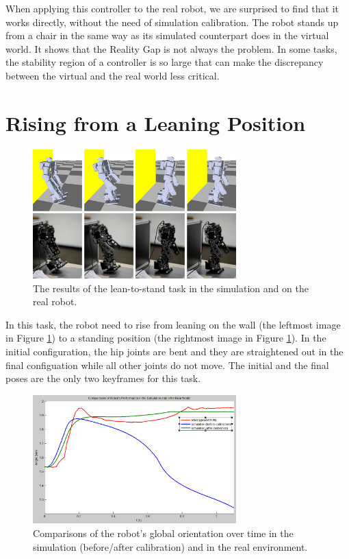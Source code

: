 When applying this controller to the real robot, we are surprised to find that it works directly, without the need of simulation calibration. The robot stands up from a chair in the same way as its simulated counterpart does in the virtual world. It shows that the Reality Gap is not always the problem. In some tasks, the stability region of a controller is so large that can make the discrepancy between the virtual and the real world less critical.

\section{Rising from a Leaning Position}

\begin{figure}[!t]
  \centering
  \includegraphics[width=0.7\textwidth]{figures/lean2Stand}
  \caption{The results of the lean-to-stand task in the simulation and on the real robot.}
  \label{fig:lean2Stand}
\end{figure}

In this task, the robot need to rise from leaning on the wall (the leftmost image in Figure \ref{fig:lean2Stand}) to a standing position (the rightmost image in Figure \ref{fig:lean2Stand}). In the initial configuration, the hip joints are bent and they are straightened out in the final configuation while all other joints do not move. The initial and the final poses are the only two keyframes for this task.

\begin{figure}[!t]
  \centering
  \includegraphics[width=0.7\textwidth]{figures/simRobotCompare}
  \caption{Comparisons of the robot's global orientation over time in the simulation (before/after calibration) and in the real environment.}
  \label{fig:simRobotCompare}
\end{figure}


